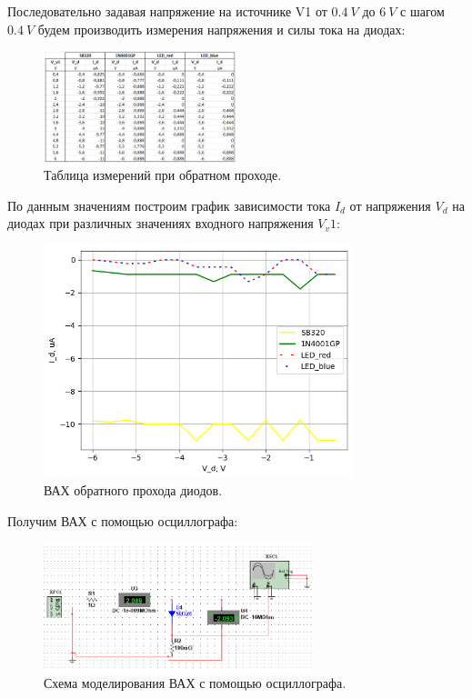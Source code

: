 \documentclass[12pt]{article}
\begin{document}
Последовательно задавая напряжение на источнике V1 от $0.4 \ V$ до $6 \ V$ с шагом $0.4 \ V$ будем производить измерения напряжения и силы тока на диодах:
\begin{figure}[H]
    \centering
    \includegraphics[width=0.5\textwidth]{table_inv_all.png}
    \caption{Таблица измерений при обратном проходе.}
    \label{fig:table_inv_all} 
\end{figure}

По данным значениям построим график зависимости тока $I_d$ от напряжения $V_d$ на диодах при различных значениях входного напряжения $V_v1$:
\begin{figure}[H]
    \centering
    \includegraphics[width=0.8\textwidth]{vac_inv_all.png}
    \caption{ВАХ обратного прохода диодов.}
    \label{fig:vac_inv_all}
\end{figure}

Получим ВАХ с помощью осциллографа:
\begin{figure}[H]
    \centering
    \includegraphics[width=0.7\textwidth]{osc_cheme.png}
    \caption{Схема моделирования ВАХ с помощью осциллографа.}
    \label{fig:osc_cheme}
\end{figure}
\end{document}
